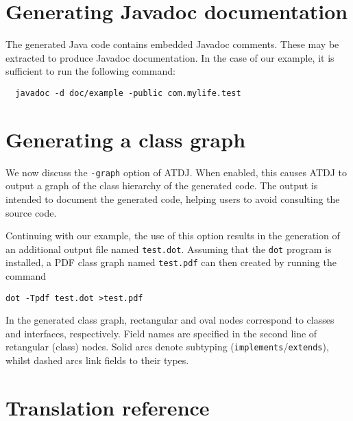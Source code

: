 
\section{Generating Javadoc documentation}

The generated Java code contains embedded Javadoc comments.
These may be extracted to produce Javadoc documentation.
In the case of our example, it is sufficient to run the following command:

\begin{verbatim}
  javadoc -d doc/example -public com.mylife.test
\end{verbatim}


\section{Generating a class graph}

We now discuss the \texttt{-graph} option of ATDJ.  When enabled, this
causes ATDJ to
output a graph of the class hierarchy of the generated code.  The output is
intended to document the generated code, helping users to avoid consulting the
source code.

Continuing with our example, the use of this option results in the
generation of
an additional output file named \texttt{test.dot}.
Assuming that the \texttt{dot}
program is installed, a PDF class graph named
\texttt{test.pdf} can then
created by running the command

\begin{verbatim}
dot -Tpdf test.dot >test.pdf
\end{verbatim}

In the generated class graph,
rectangular and oval nodes correspond to classes
and interfaces, respectively.  Field names are specified in the second line of
retangular (class) nodes.  Solid arcs denote subtyping
(\texttt{implements}/\texttt{extends}),
whilst dashed arcs link fields to their types.


\section{Translation reference}

